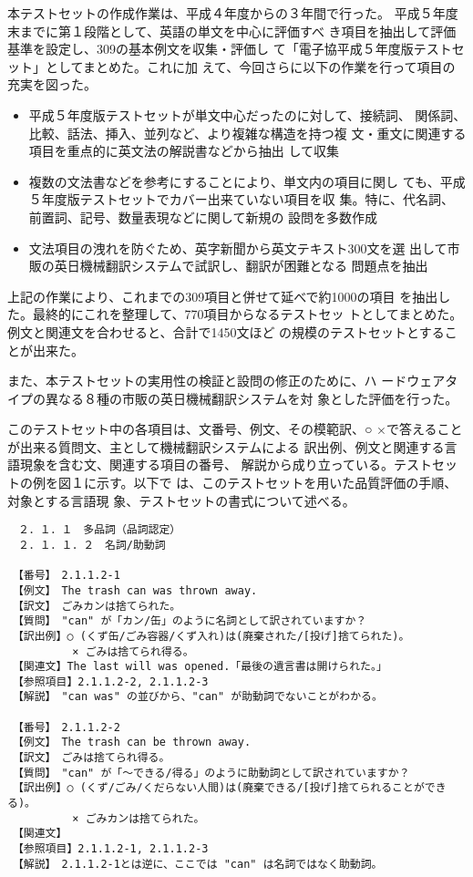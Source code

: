 本テストセットの作成作業は、平成４年度からの３年間で行った。
平成５年度末までに第１段階として、英語の単文を中心に評価すべ
き項目を抽出して評価基準を設定し、309の基本例文を収集・評価し
て「電子協平成５年度版テストセット」としてまとめた。これに加
えて、今回さらに以下の作業を行って項目の充実を図った。\\


\begin{itemize}
\item 
平成５年度版テストセットが単文中心だったのに対して、接続詞、
関係詞、比較、話法、挿入、並列など、より複雑な構造を持つ複
文・重文に関連する項目を重点的に英文法の解説書などから抽出
して収集
\item 
複数の文法書などを参考にすることにより、単文内の項目に関し
ても、平成５年度版テストセットでカバー出来ていない項目を収
集。特に、代名詞、前置詞、記号、数量表現などに関して新規の
設問を多数作成
\item 
文法項目の洩れを防ぐため、英字新聞から英文テキスト300文を選
出して市販の英日機械翻訳システムで試訳し、翻訳が困難となる
問題点を抽出\\
\end{itemize}

上記の作業により、これまでの309項目と併せて延べで約1000の項目
を抽出した。最終的にこれを整理して、770項目からなるテストセッ
トとしてまとめた。例文と関連文を合わせると、合計で1450文ほど
の規模のテストセットとすることが出来た。

また、本テストセットの実用性の検証と設問の修正のために、ハ
ードウェアタイプの異なる８種の市販の英日機械翻訳システムを対
象とした評価を行った。

このテストセット中の各項目は、文番号、例文、その模範訳、○
×で答えることが出来る質問文、主として機械翻訳システムによる
訳出例、例文と関連する言語現象を含む文、関連する項目の番号、
解説から成り立っている。テストセットの例を図１に示す。以下で
は、このテストセットを用いた品質評価の手順、対象とする言語現
象、テストセットの書式について述べる。

\vspace*{1em}
\begin{small}
\begin{verbatim}
　２．１．１　多品詞（品詞認定）
　２．１．１．２　名詞/助動詞

　【番号】　2.1.1.2-1
　【例文】　The trash can was thrown away.
　【訳文】　ごみカンは捨てられた。
　【質問】　"can" が「カン/缶」のように名詞として訳されていますか？
　【訳出例】○ (くず缶/ごみ容器/くず入れ)は(廃棄された/[投げ]捨てられた)。
　　　　　　× ごみは捨てられ得る。
　【関連文】The last will was opened.「最後の遺言書は開けられた。」
　【参照項目】2.1.1.2-2, 2.1.1.2-3
　【解説】　"can was" の並びから、"can" が助動詞でないことがわかる。
　
　【番号】　2.1.1.2-2
　【例文】　The trash can be thrown away.
　【訳文】　ごみは捨てられ得る。
　【質問】　"can" が「〜できる/得る」のように助動詞として訳されていますか？
　【訳出例】○ (くず/ごみ/くだらない人間)は(廃棄できる/[投げ]捨てられることができる)。
　　　　　　× ごみカンは捨てられた。
　【関連文】
　【参照項目】2.1.1.2-1, 2.1.1.2-3
　【解説】　2.1.1.2-1とは逆に、ここでは "can" は名詞ではなく助動詞。
\end{verbatim}
\end{small}

